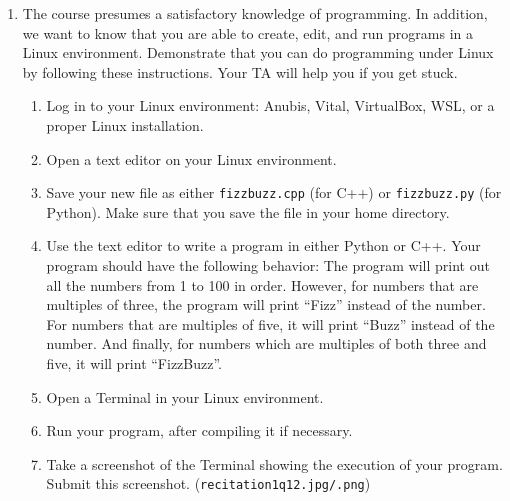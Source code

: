 \documentclass{article}
\begin{document}
\begin{enumerate}
    \item The course presumes a satisfactory knowledge of programming. In addition, we want to know that you are able to create, edit, and run programs in a Linux environment. Demonstrate that you can do programming under Linux by following these instructions. Your TA will help you if you get stuck.
    \begin{enumerate}
        \item Log in to your Linux environment: Anubis, Vital, VirtualBox, WSL, or a proper Linux installation.
        \item Open a text editor on your Linux environment.
        \item Save your new file as either \texttt{fizzbuzz.cpp} (for C++) or \texttt{fizzbuzz.py} (for Python). Make sure that you save the file in your home directory.
        \item Use the text editor to write a program in either Python or C++. Your program should have the following behavior: The program will print out all the numbers from 1 to 100 in order. However, for numbers that are multiples of three, the program will print “Fizz” instead of the number. For numbers that are multiples of five, it will print “Buzz” instead of the number. And finally, for numbers which are multiples of both three and five, it will print “FizzBuzz”.
        \item Open a Terminal in your Linux environment.
        \item Run your program, after compiling it if necessary.
        \item Take a screenshot of the Terminal showing the execution of your program. Submit this screenshot. (\texttt{recitation1q12.jpg/.png})
    \end{enumerate}
\end{enumerate}
\end{document}
